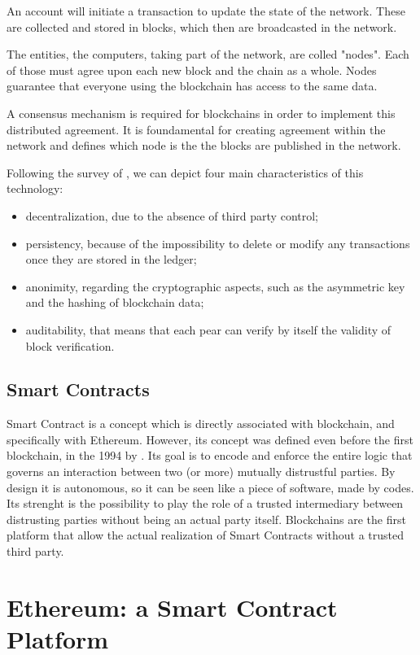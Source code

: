 An account will initiate a transaction to update the state of the network. 
These are collected and stored in blocks, which then are broadcasted in the network. 

The entities, the computers, taking part of the network, are colled "nodes". 
Each of those must agree upon each new block and the chain as a whole. 
Nodes guarantee that everyone using the blockchain has access to the same data.

A consensus mechanism is required for blockchains in order to implement this distributed agreement. 
It is foundamental for creating agreement within the network and defines 
which node is the the blocks are published in the network.

Following the survey of \citet{BlockChain1}, we can depict four main characteristics of this technology:
\begin{itemize}
    \item decentralization, due to the absence of third party control;
    \item persistency, because of the impossibility to delete or modify any transactions once they are stored in the ledger;
    \item anonimity, regarding the cryptographic aspects, such as the asymmetric key 
    and the hashing of blockchain data;
    \item auditability, that means that each pear can verify by itself the validity of block verification.
\end{itemize}


\subsection{Smart Contracts}

Smart Contract is a concept which is directly associated with blockchain, and specifically with Ethereum.
However, its concept was defined even before the first blockchain, in the 1994 by \citet{SmartContractDef}.
Its goal is to encode and enforce the entire logic that governs an interaction
between two (or more) mutually distrustful parties. By design it is autonomous, so it can be seen like a piece of software, made by codes.
Its strenght is the possibility to play the role of a trusted intermediary between distrusting parties
without being an actual party itself.
Blockchains are the first platform that allow the actual realization of
Smart Contracts without a trusted third party. 

\section{Ethereum: a Smart Contract Platform}
\label{sec:Backgroud:Ethereum}

